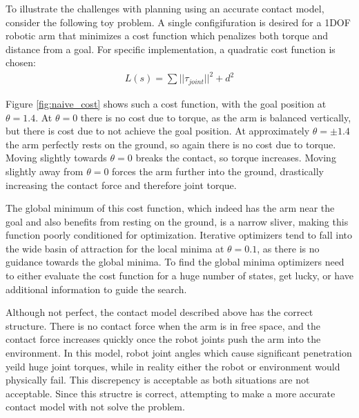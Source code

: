 \documentclass[../thesis.tex]{subfiles}
\begin{document}
To illustrate the challenges with planning using an accurate contact model, consider the following toy problem.
A single configifuration is desired for a 1DOF robotic arm that minimizes a cost function which penalizes both torque and distance from a goal.
For specific implementation, a quadratic cost function is chosen:
\begin{align}
  L(s) = \sum ||\tau_{joint}||^2 + d^2
\end{align}


Figure \ref{fig:naive_cost} shows such a cost function, with the goal position at $\theta=1.4$.
At $\theta=0$ there is no cost due to torque, as the arm is balanced vertically, but there is cost due to not achieve the goal position.
At approximately $\theta= \pm 1.4$ the arm perfectly rests on the ground, so again there is no cost due to torque.
Moving slightly towards $\theta=0$ breaks the contact, so torque increases.
Moving slightly away from $\theta=0$ forces the arm further into the ground, drastically increasing the contact force and therefore joint torque.

The global minimum of this cost function, which indeed has the arm near the goal and also benefits from resting on the ground, is a narrow sliver, making this function poorly conditioned for optimization.
Iterative optimizers tend to fall into the wide basin of attraction for the local minima at $\theta=0.1$, as there is no guidance towards the global minima.
To find the global minima optimizers need to either evaluate the cost function for a huge number of states, get lucky, or have additional information to guide the search.




Although not perfect, the contact model described above has the correct structure.
There is no contact force when the arm is in free space, and the contact force increases quickly once the robot joints push the arm into the environment.
In this model, robot joint angles which cause significant penetration yeild huge joint torques, while in reality either the robot or environment would physically fail.
This discrepency is acceptable as both situations are not acceptable.
Since this structre is correct, attempting to make a more accurate contact model with not solve the problem.
\end{document}

